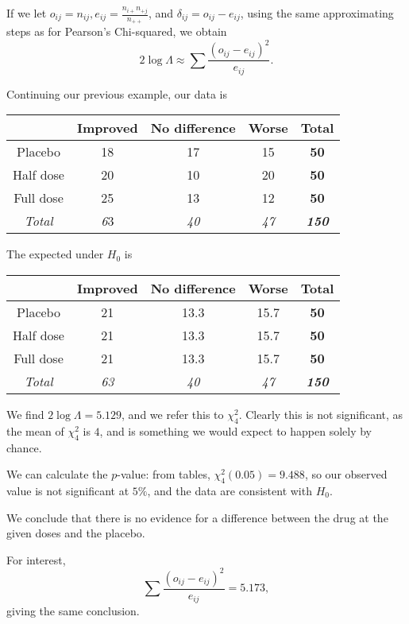 \documentclass[a4paper]{article}
\begin{document}
If we let $o_{ij}= n_{ij}, e_{ij} = \frac{n_{i+}n_{+j}}{n_{++}}$, and $\delta_{ij} = o_{ij} - e_{ij}$, using the same approximating steps as for Pearson's Chi-squared, we obtain
\[
  2\log \Lambda \approx \sum \frac{(o_{ij} - e_{ij})^2}{e_{ij}}.
\]
\begin{eg}
  Continuing our previous example, our data is
  \begin{center}
    \begin{tabular}{ccccc}
      \toprule
      & Improved & No difference & Worse & \textbf{Total}\\\midrule
      Placebo & 18 & 17 & 15 & \textbf{50} \\
      Half dose & 20 & 10 & 20 & \textbf{50} \\
      Full dose & 25 & 13 & 12& \textbf{50} \\\midrule
      \textit{Total} & \textit{6}3 & \textit{40} & \textit{47} & \textbf{\textit{150}} \\ \bottomrule
    \end{tabular}
  \end{center}
  The expected under $H_0$ is
  \begin{center}
    \begin{tabular}{ccccc}
      \toprule
      & Improved & No difference & Worse &\textbf{Total}\\\midrule
      Placebo & 21 & 13.3 & 15.7 & \textbf{50} \\
      Half dose & 21 & 13.3 & 15.7 & \textbf{50}\\
      Full dose & 21 & 13.3 & 15.7 & \textbf{50}\\\midrule
      \textit{Total}& \textit{63} & \textit{40} & \textit{47} & \textbf{\textit{150}}\\ \bottomrule
    \end{tabular}
  \end{center}
  We find $2\log \Lambda = 5.129$, and we refer this to $\chi_4^2$. Clearly this is not significant, as the mean of $\chi_4^2$ is $4$, and is something we would expect to happen solely by chance.

  We can calculate the $p$-value: from tables, $\chi_4^2(0.05) = 9.488$, so our observed value is not significant at $5\%$, and the data are consistent with $H_0$.

  We conclude that there is no evidence for a difference between the drug at the given doses and the placebo.

  For interest,
  \[
    \sum\frac{(o_{ij} - e_{ij})^2}{e_{ij}} = 5.173,
  \]
  giving the same conclusion.
\end{eg}
\end{document}
